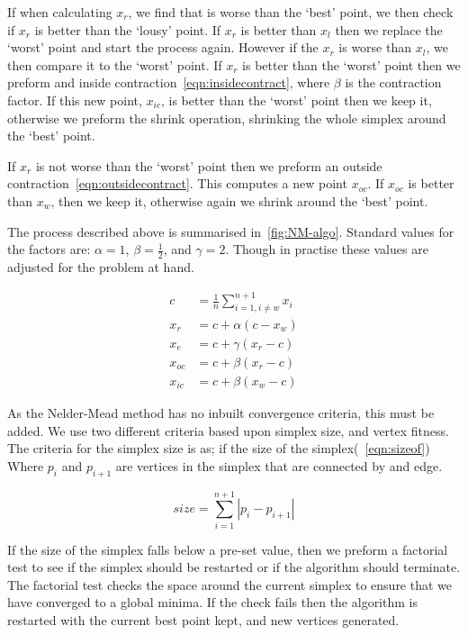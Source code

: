 If when calculating $x_r$, we find that is worse than the `best' point, we then check if $x_r$ is better than the `lousy' point.
If $x_r$ is better than $x_l$ then we replace the `worst' point and start the process again.
However if the $x_r$ is worse than $x_l$, we then compare it to the `worst' point.
If $x_r$ is better than the `worst' point then we preform and inside contraction~\cref{eqn:insidecontract}, where $\beta$ is the contraction factor.
If this new point, $x_{ic}$, is better than the `worst' point then we keep it, otherwise we preform the shrink operation, shrinking the whole simplex around the `best' point.

If $x_r$ is not worse than the `worst' point then we preform an outside contraction~\cref{eqn:outsidecontract}.
This computes a new point $x_{oc}$.
If $x_{oc}$ is better than $x_w$, then we keep it, otherwise again we shrink around the `best' point.

The process described above is summarised in~\cref{fig:NM-algo}.
Standard values for the factors are: $\alpha=1$, $\beta=\frac{1}{2}$, and $\gamma=2$.
Though in practise these values are adjusted for the problem at hand.

\begin{align}
c &= \frac{1}{n}\sum \limits_{i=1,i\neq w}^{n+1} x_i \label{eqn:centroid}\\
x_r &= c + \alpha(c - x_w)\label{eqn:reflect}\\
x_e &= c + \gamma(x_r - c)\label{eqn:expand}\\
x_{oc} &= c + \beta(x_r - c)\label{eqn:outsidecontract}\\
x_{ic} &= c + \beta(x_w - c)\label{eqn:insidecontract}
\end{align}

As the Nelder-Mead method has no inbuilt convergence criteria, this must be added.
We use two different criteria based upon simplex size, and vertex fitness.
The criteria for the simplex size is as; if the size of the simplex(~\cref{eqn:sizeof})
Where $p_i$ and $p_{i+1}$ are vertices in the simplex that are connected by and edge. 

\begin{equation}
size=\sum\limits_{i=1}^{n+1}|p_{i}-p_{i+1}|
\label{eqn:sizeof}
\end{equation}

If the size of the simplex falls below a pre-set value, then we preform a factorial test to see if the simplex should be restarted or if the algorithm should terminate.
The factorial test checks the space around the current simplex to ensure that we have converged to a global minima.
If the check fails then the algorithm is restarted with the current best point kept, and new vertices generated.


